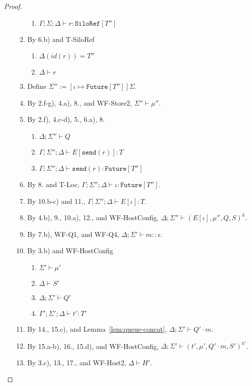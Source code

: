 \begin{proof}
\begin{itemize}
\begin{enumerate}
\begin{enumerate}[label=(\alph*)]
  \item $\Gamma ; \Sigma ; \Delta \vdash r : \texttt{SiloRef}[T'']$
  \end{enumerate}
\item By 6.b) and T-SiloRef
  \begin{enumerate}[label=(\alph*)]
  \item $\Delta(id(r)) = T''$
  \item $\Delta \vdash r$
  \end{enumerate}
\item Define $\Sigma'' := [\iota \mapsto \texttt{Future}[T'']]\Sigma$.
\item By 2.f-g), 4.a), 8., and WF-Store2, $\Sigma'' \vdash \mu''$.
\item By 2.f), 4.c-d), 5., 6.a), 8.
  \begin{enumerate}[label=(\alph*)]
  \item $\Delta ; \Sigma'' \vdash Q$
  \item $\Gamma ; \Sigma'' ; \Delta \vdash E[\texttt{send}(r)] : T$
  \item $\Gamma ; \Sigma'' ; \Delta \vdash \texttt{send}(r) : \texttt{Future}[T'']$
  \end{enumerate}
\item By 8. and T-Loc, $\Gamma ; \Sigma'' ; \Delta \vdash \iota : \texttt{Future}[T'']$.
\item By 10.b-c) and 11., $\Gamma ; \Sigma'' ; \Delta \vdash E[\iota] : T$.
\item By 4.b), 9., 10.a), 12., and WF-HostConfig, $\Delta ; \Sigma'' \vdash (E[\iota], \mu'', Q, S)^h$.
\item By 7.b), WF-Q1, and WF-Q4, $\Delta ; \Sigma' \vdash m :: \epsilon$.
\item By 3.b) and WF-HostConfig
  \begin{enumerate}[label=(\alph*)]
  \item $\Sigma' \vdash \mu'$
  \item $\Delta \vdash S'$
  \item $\Delta ; \Sigma' \vdash Q'$
  \item $\Gamma' ; \Sigma' ; \Delta \vdash t' : T'$
  \end{enumerate}
\item By 14., 15.c), and Lemma~\ref{lem:queue-concat}, $\Delta ; \Sigma' \vdash Q' \cdot m$.
\item By 15.a-b), 16., 15.d), and WF-HostConfig, $\Delta ; \Sigma' \vdash (t', \mu', Q' \cdot m, S')^{h'}$.
\item By 3.c), 13., 17., and WF-Host2, $\Delta \vdash H'$.
\end{enumerate}

\end{itemize}

\end{proof}
